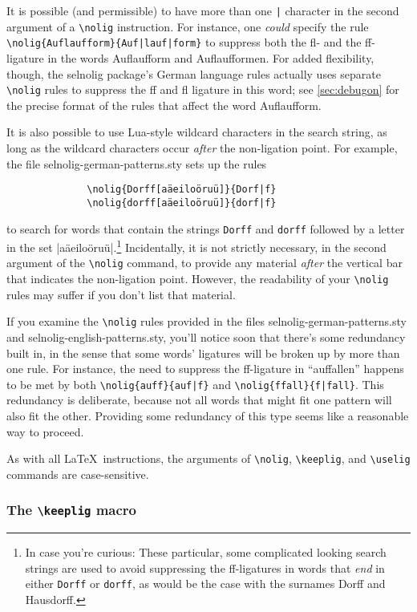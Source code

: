 \documentclass[11pt]{article}
\newcommand{\pkg}[1]{\textsf{#1}}
\newcommand{\opt}[1]{\texttt{#1}}
\newcommand{\cmmd}[1]{\texttt{\textbackslash #1}}
\begin{document}
It is possible (and permissible) to have more than one \Verb+|+ character in the second argument of a \cmmd{nolig} instruction. For instance, one \emph{could} specify the rule \Verb+\nolig{Auflaufform}{Auf|lauf|form}+ to suppress both the fl- and the ff-ligature in the words Auflaufform and Auflaufformen. For added flexibility, though, the \pkg{selnolig} package's German language rules actually uses separate \cmmd{nolig} rules to suppress the ff and fl ligature in this word; see  \cref{sec:debugon} for the precise format of the rules that affect the word Auflaufform.

It is also possible to use Lua-style wildcard characters in the search string, as long as the wildcard characters occur \emph{after} the non-ligation point. For example, the file \pkg{selnolig-german-patterns.sty} sets up the rules 
\begin{Verbatim}
              \nolig{Dorff[aäeiloöruü]}{Dorf|f}
              \nolig{dorff[aäeiloöruü]}{dorf|f}
\end{Verbatim}
to search for words that contain the strings \opt{Dorff} and \opt{dorff} followed by a letter in the set |aäeiloöruü|.\footnote{In case you're curious: These particular, some complicated looking search strings are used to avoid suppressing the ff-ligatures in words that \emph{end} in either \opt{Dorff} or \opt{dorff}, as would be the case with the surnames Dorff and Hausdorff.} Incidentally, it is not strictly necessary, in the second argument of the \cmmd{nolig} command, to provide any material \emph{after} the vertical bar that indicates the non-ligation point. However, the readability of your \cmmd{nolig} rules may suffer if you don't list that material.

If you examine the \cmmd{nolig} rules provided in the files \pkg{selnolig-german-patterns.sty} and \pkg{selnolig-english-patterns.sty}, you'll notice soon that there's some redundancy built in, in the sense that some words' ligatures will be broken up by more than one rule. For instance, the need to suppress the ff-ligature in \enquote{auffallen} happens to be met by both \Verb+\nolig{auff}{auf|f}+ and \Verb+\nolig{ffall}{f|fall}+. This redundancy is deliberate, because not all words that might fit one pattern will also fit the other. Providing some redundancy of this type seems like a reasonable way to proceed.

As with all \LaTeX\ instructions, the arguments of  \cmmd{nolig}, \cmmd{keeplig}, and \cmmd{uselig} commands are case-sensitive. 

\subsubsection{The \cmmd{keeplig} macro} 
\label{sec:keeplig}
\end{document}
